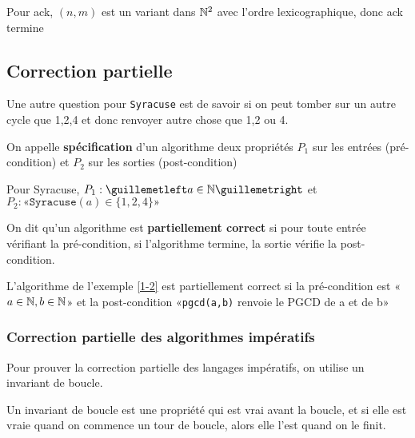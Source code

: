 \begin{example}
	Pour ack, $(n,m)$ est un variant dans $\mathbb{N}^2$ avec l'ordre lexicographique, donc ack termine
\end{example}

\subsection{Correction partielle}

Une autre question pour \texttt{Syracuse} est de savoir si on peut tomber sur un autre cycle que 1,2,4 et donc renvoyer autre chose que 1,2 ou 4.

\begin{definition}
	On appelle \textbf{spécification} d'un algorithme deux propriétés $P_1$ sur les entrées (pré-condition) et $P_2$ sur les sorties (post-condition)
\end{definition}

\begin{example}
	Pour Syracuse, $P_1 : «a\in \N»$ et $P_2 : «\texttt{Syracuse}(a) \in \{1,2,4\}»$
\end{example}

\begin{definition}
	On dit qu'un algorithme est \textbf{partiellement correct} si pour toute entrée vérifiant la pré-condition, si l'algorithme termine, la sortie vérifie la post-condition.
\end{definition}

\begin{example}
	L'algorithme de l'exemple \ref{1-2} est partiellement correct si la pré-condition est «$a\in \mathbb{N}, b \in \mathbb{N}$» et la post-condition «\texttt{pgcd(a,b)} renvoie le PGCD de a et de b» \label{1-3}
\end{example}

\subsubsection{Correction partielle des algorithmes impératifs}

Pour prouver la correction partielle des langages impératifs, on utilise un invariant de boucle.

\begin{definition}
	Un invariant de boucle est une propriété qui est vrai avant la boucle, et si elle est vraie quand on commence un tour de boucle, alors elle l'est quand on le finit.
\end{definition}

